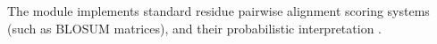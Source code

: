 The  module implements standard residue pairwise
alignment scoring systems (such as BLOSUM matrices), and their
probabilistic interpretation \citep{Altschul91}. 


